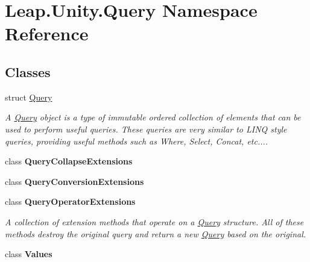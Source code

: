 \hypertarget{namespace_leap_1_1_unity_1_1_query}{}\section{Leap.\+Unity.\+Query Namespace Reference}
\label{namespace_leap_1_1_unity_1_1_query}
\subsection*{Classes}
\begin{DoxyCompactItemize}
\item 
struct \mbox{\hyperlink{struct_leap_1_1_unity_1_1_query_1_1_query}{Query}}
\begin{DoxyCompactList}\small\item\em A \mbox{\hyperlink{struct_leap_1_1_unity_1_1_query_1_1_query}{Query}} object is a type of immutable ordered collection of elements that can be used to perform useful queries. These queries are very similar to L\+I\+NQ style queries, providing useful methods such as Where, Select, Concat, etc.... \end{DoxyCompactList}\item 
class {\bfseries Query\+Collapse\+Extensions}
\item 
class {\bfseries Query\+Conversion\+Extensions}
\item 
class {\bfseries Query\+Operator\+Extensions}
\begin{DoxyCompactList}\small\item\em A collection of extension methods that operate on a \mbox{\hyperlink{struct_leap_1_1_unity_1_1_query_1_1_query}{Query}} structure. All of these methods destroy the original query and return a new \mbox{\hyperlink{struct_leap_1_1_unity_1_1_query_1_1_query}{Query}} based on the original. \end{DoxyCompactList}\item 
class {\bfseries Values}
\end{DoxyCompactItemize}
